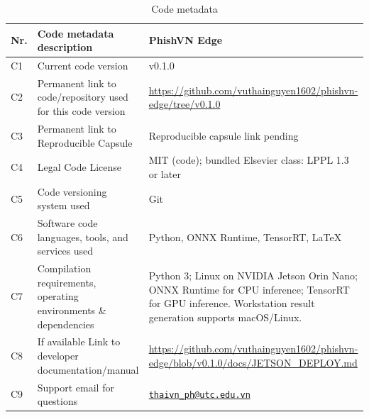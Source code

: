 \begin{table}[t]
\caption*{Code metadata}
\small
\renewcommand{\arraystretch}{1.18}
\begin{tabularx}{\textwidth}{@{}l >{\raggedright\arraybackslash}p{} >{\raggedright\arraybackslash}X@{}}
\toprule
Nr. & Code metadata description & PhishVN Edge \\
\midrule
C1 & Current code version & v0.1.0 \\
C2 & Permanent link to code/repository used for this code version & \url{https://github.com/vuthainguyen1602/phishvn-edge/tree/v0.1.0} \\
C3 & Permanent link to Reproducible Capsule & Reproducible capsule link pending \\
C4 & Legal Code License & MIT (code); bundled Elsevier class: LPPL 1.3 or later \\
C5 & Code versioning system used & Git \\
C6 & Software code languages, tools, and services used & Python, ONNX Runtime, TensorRT, LaTeX \\
C7 & Compilation requirements, operating environments \& dependencies & Python 3; Linux on NVIDIA Jetson Orin Nano; ONNX Runtime for CPU inference; TensorRT for GPU inference. Workstation result generation supports macOS/Linux. \\
C8 & If available Link to developer documentation/manual & \url{https://github.com/vuthainguyen1602/phishvn-edge/blob/v0.1.0/docs/JETSON_DEPLOY.md} \\
C9 & Support email for questions & \href{mailto:thaivn_ph@utc.edu.vn}{\nolinkurl{thaivn_ph@utc.edu.vn}} \\
\bottomrule
\end{tabularx}
\end{table}
